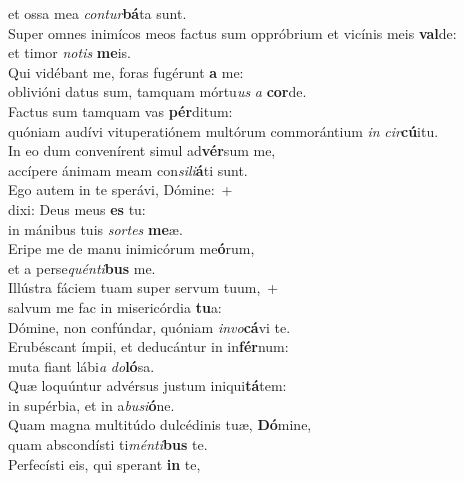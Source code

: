 \oddverse et ossa mea \textit{con}\textit{tur}\textbf{bá}ta sunt.\\
\evenverse Super omnes inimícos meos factus sum oppróbrium et vicínis meis \textbf{val}de:~\*\\
\evenverse et timor \textit{no}\textit{tis} \textbf{me}is.\\
\oddverse Qui vidébant me, foras fugérunt \textbf{a} me:~\*\\
\oddverse oblivióni datus sum, tamquam mórtu\textit{us} \textit{a} \textbf{cor}de.\\
\evenverse Factus sum tamquam vas \textbf{pér}ditum:~\*\\
\evenverse quóniam audívi vituperatiónem multórum commorántium \textit{in} \textit{cir}\textbf{cú}itu.\\
\oddverse In eo dum convenírent simul ad\textbf{vér}sum me,~\*\\
\oddverse accípere ánimam meam con\textit{si}\textit{li}\textbf{á}ti sunt.\\
\evenverse Ego autem in te sperávi, Dómine:~+\\
\evenverse  dixi: Deus meus \textbf{es} tu:~\*\\
\evenverse in mánibus tuis \textit{sor}\textit{tes} \textbf{me}æ.\\
\oddverse Eripe me de manu inimicórum me\textbf{ó}rum,~\*\\
\oddverse et a perse\textit{quén}\textit{ti}\textbf{bus} me.\\
\evenverse Illústra fáciem tuam super servum tuum,~+\\
\evenverse  salvum me fac in misericórdia \textbf{tu}a:~\*\\
\evenverse Dómine, non confúndar, quóniam \textit{in}\textit{vo}\textbf{cá}vi te.\\
\oddverse Erubéscant ímpii, et deducántur in in\textbf{fér}num:~\*\\
\oddverse muta fiant lábi\textit{a} \textit{do}\textbf{ló}sa.\\
\evenverse Quæ loquúntur advérsus justum iniqui\textbf{tá}tem:~\*\\
\evenverse in supérbia, et in a\textit{bu}\textit{si}\textbf{ó}ne.\\
\oddverse Quam magna multitúdo dulcédinis tuæ, \textbf{Dó}mine,~\*\\
\oddverse quam abscondísti ti\textit{mén}\textit{ti}\textbf{bus} te.\\
\evenverse Perfecísti eis, qui sperant \textbf{in} te,~\*\\
